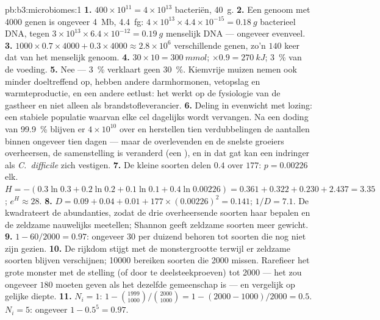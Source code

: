 \begin{solution}{pb:b3:microbiomes:1}
\textbf{1.} $400\times 10^{11} = 4\times 10^{13}$ bacteriën, \qty{40}{g}.
\textbf{2.} Een genoom met \num{4000} genen is ongeveer \qty{4}{Mb},
\qty{4.4}{fg}: $4\times 10^{13}\times 4.4\times 10^{-15} = \qty{0.18}{g}$
bacterieel DNA, tegen $3\times 10^{13}\times 6.4\times 10^{-12} = \qty{0.19}{g}$
menselijk DNA --- ongeveer evenveel.
\textbf{3.} $1000\times 0.7\times 4000 + 0.3\times 4000 \approx 2.8\times
10^{6}$ verschillende genen, zo'n $140$ keer dat van het menselijk
genoom.
\textbf{4.} $30\times 10 = \qty{300}{mmol}$; $\times 0.9 = \qty{270}{kJ}$;
\qty{3}{\%} van de voeding.
\textbf{5.} Nee --- \qty{3}{\%} verklaart geen \qty{30}{\%}. Kiemvrije
muizen nemen ook minder doeltreffend op, hebben andere darmhormonen,
vetopslag en warmteproductie, en een andere eetlust: het 
werkt op de fysiologie van de gastheer en niet alleen als
brandstofleverancier.
\textbf{6.} Deling in evenwicht met lozing: een stabiele populatie
waarvan elke cel dagelijks wordt vervangen. Na een doding van
\qty{99.9}{\%} blijven er $4\times 10^{10}$ over en herstellen tien
verdubbelingen de aantallen binnen ongeveer tien dagen --- maar de
overlevenden en de snelste groeiers overheersen, de samenstelling is
veranderd (een ), en in dat gat kan een indringer als
\emph{C.~difficile} zich vestigen.
\textbf{7.} De kleine soorten delen $0.4$ over $177$: $p = 0.00226$ elk. $H
= -(0.3\ln 0.3 + 0.2\ln 0.2 + 0.1\ln 0.1 + 0.4\ln 0.00226) = 0.361 +
0.322 + 0.230 + 2.437 = 3.35$; $e^{H} \approx 28$.
\textbf{8.} $D = 0.09 + 0.04 + 0.01 + 177\times (0.00226)^{2} = 0.141$;
$1/D = 7.1$. De  kwadrateert de abundanties, zodat de drie
overheersende soorten haar bepalen en de zeldzame nauwelijks meetellen;
Shannon geeft zeldzame soorten meer gewicht.
\textbf{9.} $1 - 60/2000 = 0.97$: ongeveer $30$  per duizend
behoren tot soorten die nog niet zijn gezien.
\textbf{10.} De rijkdom stijgt met de monstergrootte terwijl er zeldzame
soorten blijven verschijnen; \num{10000}  bereiken soorten die
\num{2000} missen. Rarefieer het grote monster met de stelling (of door
te deelsteekproeven) tot \num{2000}  --- het zou ongeveer $180$
moeten geven als het dezelfde gemeenschap is --- en vergelijk op
gelijke diepte.
\textbf{11.} $N_{i} = 1$: $1 - \binom{1999}{1000}/\binom{2000}{1000} =
1 - (2000 - 1000)/2000 = 0.5$. $N_{i} = 5$: ongeveer $1 - 0.5^{5} = 0.97$.

\end{solution}
